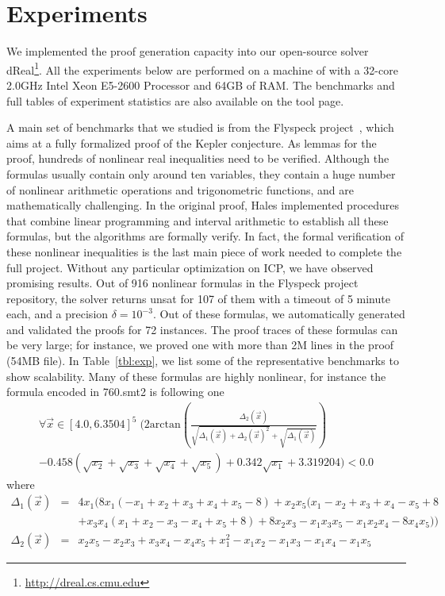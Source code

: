 \section{Experiments}\label{kepler}
We implemented the proof generation capacity into our open-source solver {\sf
  dReal}\footnote{\url{http://dreal.cs.cmu.edu} }. All the experiments below are performed on a machine of with a 32-core 2.0GHz Intel
Xeon E5-2600 Processor and 64GB of RAM. The benchmarks and full tables of experiment statistics are also available on the tool page. 



A main set of benchmarks that we studied is from the Flyspeck project~\cite{DBLP:conf/dagstuhl/Hales05,DBLP:conf/nfm/SolovyevH13}, which aims at a 
fully formalized proof of the Kepler conjecture. As lemmas for the
proof, hundreds of nonlinear real inequalities need to be verified.
Although the formulas usually contain only around ten variables, they
contain a huge number of nonlinear arithmetic operations and
trigonometric functions, and are mathematically challenging. In the original proof, Hales implemented procedures that combine
linear programming and interval arithmetic to establish all these
formulas, but the algorithms are formally verify. In
fact, the formal verification of these nonlinear inequalities is the last main piece
of work needed to complete the full project. 
Without any particular optimization on ICP, we have observed
promising results. Out of 916 nonlinear formulas in the Flyspeck
project repository, the solver returns {\sf unsat} for 107 of them with a timeout of 5 minute each, and a precision $\delta=10^{-3}$. Out of these formulas, we automatically generated and validated the proofs for 72 instances. The proof traces of these formulas can be very
large; for instance, we proved one with more than 2M lines in the
proof (54MB file). In Table~\ref{tbl:exp}, we list some of the
representative benchmarks to show scalability. Many of these formulas are highly nonlinear, for instance the formula encoded in 760.smt2 is following one 
\begin{multline*}
\forall\vec{x} \in [4.0, 6.3504]^5\; \Big(2\mathrm{arctan} (\frac{\Delta_2(\vec x)}{\sqrt{\Delta_1(\vec x) + \Delta_2(\vec x)^2} + \sqrt{\Delta_1(\vec x)}})\\
- 0.458(\sqrt{x_2} + \sqrt{x_3} +\sqrt{x_4} + \sqrt{x_5}) + 0.342\sqrt{x_1} + 3.319204\Big) < 0.0
\end{multline*}
where
\begin{eqnarray*}
  \Delta_1(\vec{x}) &=& 4x_1 (8x_1 (-x_1 + x_2 + x_3 + x_4 + x_5 - 8) + x_2 x_5 (x_1 - x_2 + x_3 + x_4 - x_5+8\\%
& &+ x_3x_4(x_1 + x_2 - x_3 - x_4 + x_5 + 8)+ 8 x_2 x_3 - x_1 x_3 x_5 - x_1  x_2  x_4 - 8 x_4 x_5))\\
\Delta_2(\vec{x}) &=& x_2 x_5 -x_2 x_3 + x_3x_4 - x_4 x_5 +x_1^2 -x_1x_2 - x_1x_3 - x_1x_4 -x_1 x_5
\end{eqnarray*}

